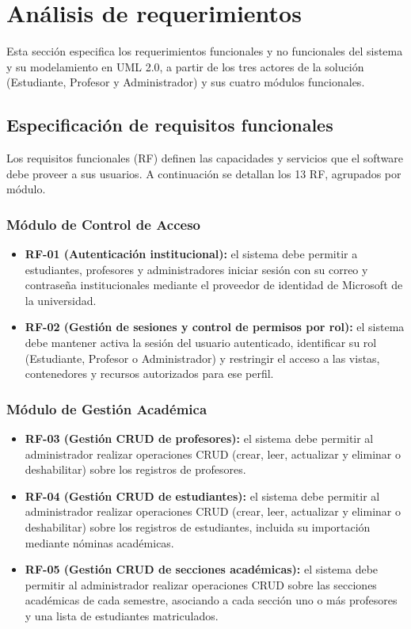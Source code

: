 \section{Análisis de requerimientos}
\label{sec:analisis_requerimientos}

Esta sección especifica los requerimientos funcionales y no funcionales del sistema y su modelamiento en UML 2.0, a partir de los tres actores de la solución (Estudiante, Profesor y Administrador) y sus cuatro módulos funcionales.

\subsection{Especificación de requisitos funcionales}
\label{subsec:requisitos_funcionales}

Los requisitos funcionales (RF) definen las capacidades y servicios que el software debe proveer a sus usuarios. A continuación se detallan los 13 RF, agrupados por módulo.

\subsubsection{Módulo de Control de Acceso}
\begin{itemize}
    \item \textbf{RF-01 (Autenticación institucional):} el sistema debe permitir a estudiantes, profesores y administradores iniciar sesión con su correo y contraseña institucionales mediante el proveedor de identidad de Microsoft de la universidad.
    \item \textbf{RF-02 (Gestión de sesiones y control de permisos por rol):} el sistema debe mantener activa la sesión del usuario autenticado, identificar su rol (Estudiante, Profesor o Administrador) y restringir el acceso a las vistas, contenedores y recursos autorizados para ese perfil.
\end{itemize}

\subsubsection{Módulo de Gestión Académica}
\begin{itemize}
    \item \textbf{RF-03 (Gestión CRUD de profesores):} el sistema debe permitir al administrador realizar operaciones CRUD (crear, leer, actualizar y eliminar o deshabilitar) sobre los registros de profesores.
    \item \textbf{RF-04 (Gestión CRUD de estudiantes):} el sistema debe permitir al administrador realizar operaciones CRUD (crear, leer, actualizar y eliminar o deshabilitar) sobre los registros de estudiantes, incluida su importación mediante nóminas académicas.
    \item \textbf{RF-05 (Gestión CRUD de secciones académicas):} el sistema debe permitir al administrador realizar operaciones CRUD sobre las secciones académicas de cada semestre, asociando a cada sección uno o más profesores y una lista de estudiantes matriculados.
\end{itemize}

